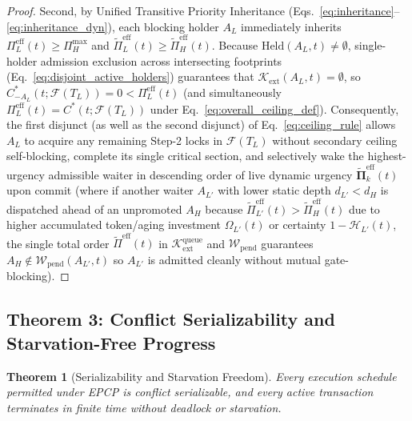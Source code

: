 \documentclass[conference,10pt]{IEEEtran}
\newtheorem{theorem}{Theorem}
\begin{document}
\begin{proof}
Second, by Unified Transitive Priority Inheritance (Eqs.~\eqref{eq:inheritance}--\eqref{eq:inheritance_dyn}), each blocking holder $A_L$ immediately inherits $\Pi_L^{\text{eff}}(t) \ge \Pi_H^{\max}$ and $\tilde{\Pi}_L^{\text{eff}}(t) \ge \tilde{\Pi}_H^{\text{eff}}(t)$. Because $\text{Held}(A_L, t) \ne \emptyset$, single-holder admission exclusion across intersecting footprints (Eq.~\eqref{eq:disjoint_active_holders}) guarantees that $\mathcal{K}_{\text{ext}}(A_L, t) = \emptyset$, so $C_{-A_L}^*(t; \mathcal{F}(T_L)) = 0 < \Pi_L^{\text{eff}}(t)$ (and simultaneously $\Pi_L^{\text{eff}}(t) = C^*(t; \mathcal{F}(T_L))$ under Eq.~\eqref{eq:overall_ceiling_def}). Consequently, the first disjunct (as well as the second disjunct) of Eq.~\eqref{eq:ceiling_rule} allows $A_L$ to acquire any remaining Step-2 locks in $\mathcal{F}(T_L)$ without secondary ceiling self-blocking, complete its single critical section, and selectively wake the highest-urgency admissible waiter in descending order of live dynamic urgency $\tilde{\mathbf{\Pi}}_k^{\text{eff}}(t)$ upon commit (where if another waiter $A_{L'}$ with lower static depth $d_{L'} < d_H$ is dispatched ahead of an unpromoted $A_H$ because $\tilde{\Pi}_{L'}^{\text{eff}}(t) > \tilde{\Pi}_H^{\text{eff}}(t)$ due to higher accumulated token/aging investment $\Omega_{L'}(t)$ or certainty $1-\mathcal{H}_{L'}(t)$, the single total order $\tilde{\Pi}^{\text{eff}}(t)$ in $\mathcal{K}_{\text{ext}}^{\text{queue}}$ and $\mathcal{W}_{\text{pend}}$ guarantees $A_H \notin \mathcal{W}_{\text{pend}}(A_{L'}, t)$ so $A_{L'}$ is admitted cleanly without mutual gate-blocking).
\end{proof}

\subsection{Theorem 3: Conflict Serializability and Starvation-Free Progress}
\begin{theorem}[Serializability and Starvation Freedom]
Every execution schedule permitted under EPCP is conflict serializable, and every active transaction terminates in finite time without deadlock or starvation.
\end{theorem}
\end{document}
